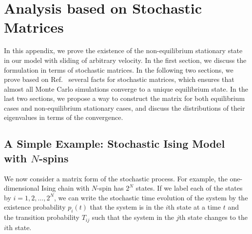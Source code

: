 
\chapter{Analysis based on Stochastic Matrices}
\label{chap:ProofEx}

In this appendix, we prove the existence of the non-equilibrium stationary state in our model with sliding of arbitrary velocity. In the first section, we discuss the formulation in terms of stochastic matrices. In the following two sections, we prove based on Ref.~\cite{Hara2011} several facts for stochastic matrices, which ensures that almost all Monte Carlo simulations converge to a unique equilibrium state. In the last two sections, we propose a way to construct the matrix for both equilibrium cases and non-equilibrium stationary cases, and discuss the distributions of their eigenvalues in terms of the convergence.

\section{A Simple Example: Stochastic Ising Model with $N$-spins}
We now consider a matrix form of the stochastic process. For example, the one-dimensional Ising chain with $N$-spin has $2^{N}$ states. If we label each of the states by $i=1,2,\dots,2^{N}$, we can write the stochastic time evolution of the system by the existence probability $p_{i}(t)$ that the system is in the $i$th state at a time $t$ and the transition probability $T_{ij}$ such that the system in the $j$th state changes to the $i$th state.

